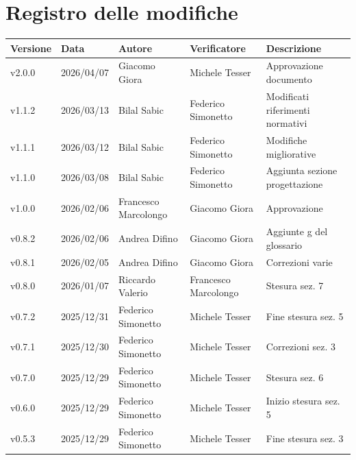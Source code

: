 \documentclass[a4paper,12pt]{article}
\newcommand{\DataUltimaModifica}{2026/04/07}
\newcommand{\VersioneDocumento}{v2.0.0}
\begin{document}
\section*{Registro delle modifiche}{
    \begin{center}
        \begin{tabularx}{\textwidth}{|l|l|l|l|X|}
            \hline
            \textbf{Versione} & \textbf{Data} & \textbf{Autore} & \textbf{Verificatore} & \textbf{Descrizione} \\
            \hline
            \VersioneDocumento & \DataUltimaModifica & Giacomo Giora & Michele Tesser & Approvazione documento\\
            \hline
            v1.1.2 & 2026/03/13 & Bilal Sabic & Federico Simonetto & Modificati riferimenti normativi\\
            \hline
            v1.1.1 & 2026/03/12 & Bilal Sabic & Federico Simonetto & Modifiche migliorative \\
            \hline 
            v1.1.0 & 2026/03/08 & Bilal Sabic & Federico Simonetto & Aggiunta sezione progettazione \\
            \hline
            v1.0.0 & 2026/02/06 & Francesco Marcolongo & Giacomo Giora &  Approvazione \\
            \hline
            v0.8.2 & 2026/02/06 & Andrea Difino & Giacomo Giora &  Aggiunte g del glossario \\
            \hline
            v0.8.1 & 2026/02/05 & Andrea Difino & Giacomo Giora & Correzioni varie\\
            \hline
            v0.8.0 & 2026/01/07 & Riccardo Valerio & Francesco Marcolongo & Stesura sez. 7\\
            \hline
            v0.7.2 & 2025/12/31 & Federico Simonetto & Michele Tesser & Fine stesura sez. 5\\
            \hline
            v0.7.1 & 2025/12/30 & Federico Simonetto & Michele Tesser & Correzioni sez. 3\\
            \hline
            v0.7.0 & 2025/12/29 & Federico Simonetto & Michele Tesser & Stesura sez. 6 \\
            \hline
            v0.6.0 & 2025/12/29 & Federico Simonetto & Michele Tesser & Inizio stesura sez. 5\\
            \hline
            v0.5.3 & 2025/12/29 & Federico Simonetto & Michele Tesser & Fine stesura sez. 3\\

\end{tabularx}
\end{center}}
\end{document}
